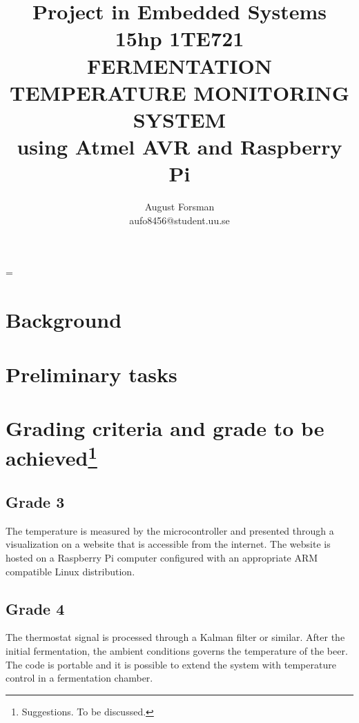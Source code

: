 \documentclass[10pt]{article}
\title{\renewcommand{\baselinestretch}{1.17}\normalsize\bf%
  Project in Embedded Systems 15hp 1TE721\\
  \vspace{2mm}
  \uppercase{Fermentation temperature monitoring system}\\
  using Atmel AVR and Raspberry Pi\\
}
\author{%
  August Forsman\\
  \small aufo8456@student.uu.se
}
\begin{document}
\date{}

\maketitle

\vspace{-0.5cm}



\baselineskip=\normalbaselineskip

\section*{Background}%
\label{sec:background}
\section*{Preliminary tasks}%
\label{sec:preliminary_tasks}
\section*{Grading criteria and grade to be achieved\protect\footnote{Suggestions. To be discussed.}}%
\label{sec:grading_criteria_and_grading_goal}
\subsection*{Grade 3}%
\label{sub:grade_3}
The temperature is measured by the microcontroller and presented through a visualization on a website that is accessible from the internet. The website is hosted on a Raspberry Pi computer configured with an appropriate ARM compatible Linux distribution.
\subsection*{Grade 4}%
\label{sub:grade_4}
The thermostat signal is processed through a Kalman filter or similar. After the initial fermentation, the ambient conditions governs the temperature of the beer. The code is portable and it is possible to extend the system with temperature control in a fermentation chamber.
\end{document}
